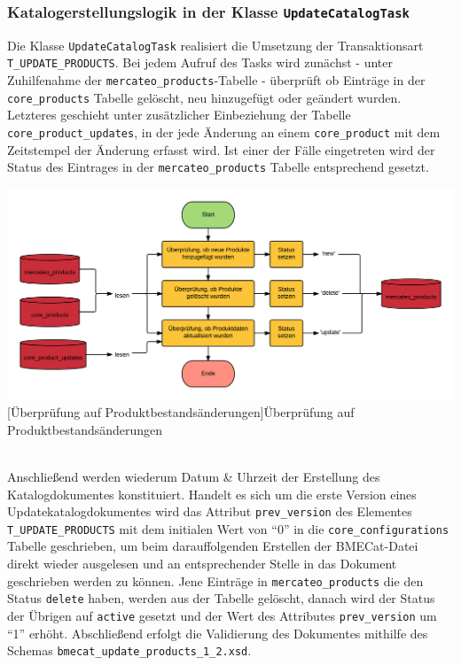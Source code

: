 	\subsubsection{Katalogerstellungslogik in der Klasse \texttt{UpdateCatalogTask} }
    Die	Klasse \texttt{UpdateCatalogTask} realisiert die Umsetzung der Transaktionsart
	\texttt{T\_UPDATE\_PRODUCTS}.
	Bei jedem  Aufruf des Tasks wird zunächst - unter Zuhilfenahme der \texttt{mercateo\_products}-Tabelle - überprüft ob Einträge in der \texttt{core\_products} Tabelle gelöscht, neu hinzugefügt oder geändert wurden. Letzteres geschieht unter zusätzlicher Einbeziehung der Tabelle \texttt{core\_product\_updates}, in der jede Änderung an einem \texttt{core\_product} mit dem Zeitstempel der Änderung erfasst wird. Ist einer der Fälle eingetreten wird der Status des Eintrages in der \texttt{mercateo\_products} Tabelle entsprechend gesetzt. \\
	\begin{minipage}{\linewidth}
		\vspace{1em}
		\centering
		\includegraphics[width=1 \linewidth]{img/productChangeCheck}
		[Überprüfung auf Produktbestandsänderungen]{Überprüfung auf Produktbestandsänderungen}
		\vspace{1em}
	\end{minipage}\\
	
	
	Anschließend werden wiederum Datum \& Uhrzeit der Erstellung des Katalogdokumentes konstituiert.
	Handelt es sich um die erste Version eines Updatekatalogdokumentes wird das Attribut \texttt{prev\_version} des Elementes \texttt{T\_UPDATE\_PRODUCTS} mit dem initialen Wert von \enquote{0} in die \texttt{core\_configurations} Tabelle geschrieben, um beim darauffolgenden Erstellen der BMECat-Datei direkt wieder ausgelesen und an entsprechender Stelle in das Dokument geschrieben werden zu können.
	Jene Einträge in \texttt{mercateo\_products} die den Status \texttt{delete} haben, werden aus der Tabelle gelöscht, danach wird der Status der Übrigen auf \texttt{active} gesetzt und  der Wert des Attributes \texttt{prev\_version} um \enquote{1} erhöht. Abschließend erfolgt die Validierung des Dokumentes mithilfe des Schemas \texttt{bmecat\_update\_products\_1\_2.xsd}.
	

